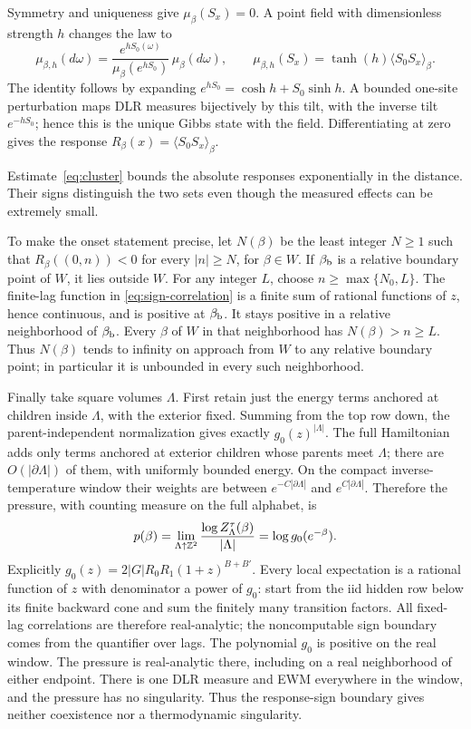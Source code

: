 Symmetry and uniqueness give \(\mu_\beta(S_x)=0\). A point field with dimensionless strength \(h\) changes the law to
\begin{equation}\label{eq:point-field}
 \mu_{\beta,h}(d\omega)=
 \frac{e^{hS_0(\omega)}}{\mu_\beta(e^{hS_0})}\,\mu_\beta(d\omega),\qquad
 \mu_{\beta,h}(S_x)=\tanh(h)\langle S_0S_x\rangle_\beta.
\end{equation}
The identity follows by expanding \(e^{hS_0}=\cosh h+S_0\sinh h\). A bounded one-site perturbation maps DLR measures bijectively by this tilt, with the inverse tilt \(e^{-hS_0}\); hence this is the unique Gibbs state with the field. Differentiating at zero gives the response \(R_\beta(x)=\langle S_0S_x\rangle_\beta\).

Estimate~\eqref{eq:cluster} bounds the absolute responses exponentially in the distance. Their signs distinguish the two sets even though the measured effects can be extremely small.

To make the onset statement precise, let \(N(\beta)\) be the least integer \(N\ge1\) such that \(R_\beta((0,n))<0\) for every \(|n|\ge N\), for \(\beta\in W\). If \(\beta_{\rm b}\) is a relative boundary point of \(W\), it lies outside \(W\). For any integer \(L\), choose \(n\ge\max\{N_0,L\}\). The finite-lag function in \eqref{eq:sign-correlation} is a finite sum of rational functions of \(z\), hence continuous, and is positive at \(\beta_{\rm b}\). It stays positive in a relative neighborhood of \(\beta_{\rm b}\). Every \(\beta\) of \(W\) in that neighborhood has \(N(\beta)>n\ge L\). Thus \(N(\beta)\) tends to infinity on approach from \(W\) to any relative boundary point; in particular it is unbounded in every such neighborhood.

Finally take square volumes \(\Lambda\). First retain just the energy terms anchored at children inside \(\Lambda\), with the exterior fixed. Summing from the top row down, the parent-independent normalization gives exactly \(g_0(z)^{|\Lambda|}\). The full Hamiltonian adds only terms anchored at exterior children whose parents meet \(\Lambda\); there are \(O(|\partial\Lambda|)\) of them, with uniformly bounded energy. On the compact inverse-temperature window their weights are between \(e^{-C|\partial\Lambda|}\) and \(e^{C|\partial\Lambda|}\). Therefore the pressure, with counting measure on the full alphabet, is
\begin{equation}\label{eq:sign-pressure}
 p(\beta)=\lim_{\Lambda\uparrow\mathbb Z^2}\frac{\log Z_\Lambda^\tau(\beta)}{|\Lambda|}
 =\log g_0(e^{-\beta}).
\end{equation}
Explicitly \(g_0(z)=2|G|R_0R_1(1+z)^{B+B'}\). Every local expectation is a rational function of \(z\) with denominator a power of \(g_0\): start from the iid hidden row below its finite backward cone and sum the finitely many transition factors. All fixed-lag correlations are therefore real-analytic; the noncomputable sign boundary comes from the quantifier over lags. The polynomial \(g_0\) is positive on the real window. The pressure is real-analytic there, including on a real neighborhood of either endpoint. There is one DLR measure and EWM everywhere in the window, and the pressure has no singularity. Thus the response-sign boundary gives neither coexistence nor a thermodynamic singularity.

